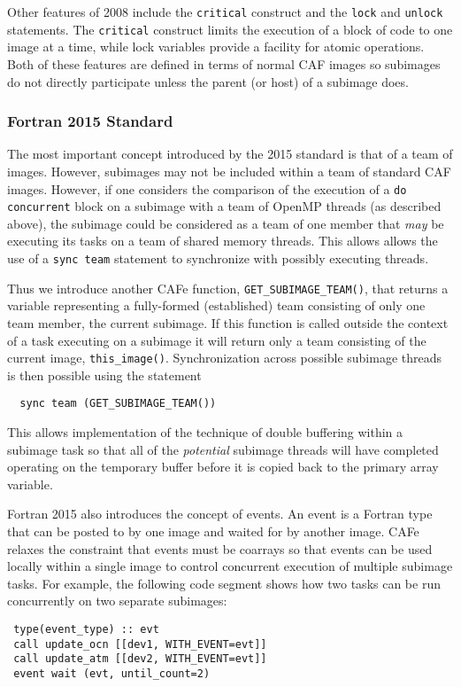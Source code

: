 Other features of 2008 include the \texttt{critical} construct and the \texttt{lock} and
\texttt{unlock} statements.  The \texttt{critical} construct limits the execution of a
block of code to one image at a time, while lock variables provide a facility for atomic
operations.  Both of these features are defined in terms of normal CAF images so subimages
do not directly participate unless the parent (or host) of a subimage does.

\subsubsection{Fortran 2015 Standard}

The most important concept introduced by the 2015 standard is that of a team of images.
However, subimages may not be included within a team of standard CAF images.  However, if one
considers the comparison of the execution of a \texttt{do concurrent} block on a subimage
with a team of OpenMP threads (as described above), the subimage could be considered as
a team of one member that \emph{may} be executing its tasks on a team of shared memory threads.
This allows allows the use of a \texttt{sync team} statement to synchronize with
possibly executing threads.

Thus we introduce another CAFe function, \texttt{GET\_SUBIMAGE\_TEAM()}, that returns a
variable representing a fully-formed (established) team consisting of only one team
member, the current subimage.  If this function is called outside the context of a task
executing on a subimage it will return only a team consisting of the current image,
\texttt{this\_image()}.  Synchronization across possible subimage threads is then possible
using the statement
\small
\begin{verbatim}
  sync team (GET_SUBIMAGE_TEAM())
\end{verbatim}
\normalsize
This allows implementation of the technique of double buffering within a subimage task
so that all of the \emph{potential} subimage threads will have completed operating on the
temporary buffer before it is copied back to the primary array variable.

Fortran 2015 also introduces the concept of events.  An event is a Fortran type that
can be posted to by one image and waited for by another image.  CAFe relaxes the
constraint that events must be coarrays so that events can be used locally within
a single image to control concurrent execution of multiple subimage tasks.  For example,
the following code segment shows how two tasks can be run concurrently on two separate
subimages:
\small
\begin{verbatim}
 type(event_type) :: evt
 call update_ocn [[dev1, WITH_EVENT=evt]]
 call update_atm [[dev2, WITH_EVENT=evt]]
 event wait (evt, until_count=2)
\end{verbatim}
\normalsize

